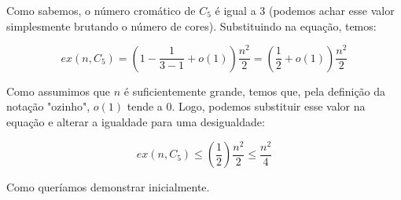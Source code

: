 \documentclass{article}
\begin{document}
\begin{enumerate}
\begin{itemize}
		            Como sabemos, o número cromático de \(C_5\) é igual a 3 (podemos achar esse valor simplesmente brutando o número de cores). Substituindo na equação, temos:

		            \[ex(n, C_5) = (1 - \frac{1}{3 - 1} + o(1))\frac{n^2}{2} = (\frac{1}{2} + o(1))\frac{n^2}{2}\]

		            Como assumimos que \(n\) é suficientemente grande, temos que, pela definição da notação "ozinho", \(o(1)\) tende a 0. Logo, podemos substituir esse valor na equação e alterar a igualdade para uma desigualdade:

		            \[ex(n, C_5) \leq (\frac{1}{2})\frac{n^2}{2} \leq \frac{n^2}{4}\]

		            Como queríamos demonstrar inicialmente.

	      \end{itemize}
\end{enumerate}
\end{document}
